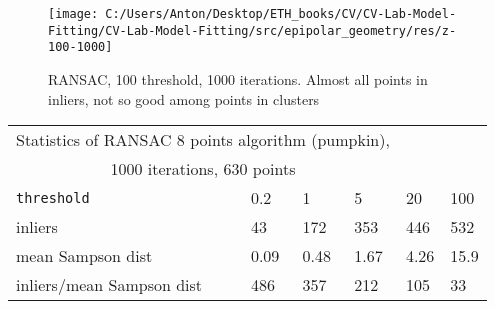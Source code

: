 \documentclass{report}
\begin{document}
\begin{figure}[h!]
	\begin{center}
		\begin{minipage}[h]{0.9\linewidth}
			\texttt{[image: C:/Users/Anton/Desktop/ETH\_books/CV/CV-Lab-Model-Fitting/CV-Lab-Model-Fitting/src/epipolar\_geometry/res/z-100-1000]}
			\caption{RANSAC, 100 threshold, 1000 iterations. Almost all points in inliers, not so good among points in clusters}
		\end{minipage}
	\end{center}
\end{figure}	

\begin{center}
	\begin{tabular}{|l|l|l|l|l|l|}
		\multicolumn{4}{c}{Statistics of RANSAC 8 points algorithm (pumpkin),}\\
		 \multicolumn{4}{c}{1000 iterations, 630 points }\\
		 
		\hline
		\texttt{threshold} &0.2&1 & 5 & 20 & 100 \\
		\hline
	inliers&43&172&353 & 446 &532 \\
	\hline 	
	mean Sampson dist &0.09&0.48&1.67&4.26&15.9 \\
		\hline
	inliers/mean Sampson dist &486&357& 212& 105 & 33\\ \hline
	\end{tabular}
\end{center}
\end{document}
